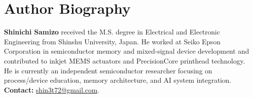 \documentclass[conference]{IEEEtran}
\begin{document}
\section*{Author Biography}
\textbf{Shinichi Samizo} received the M.S. degree in Electrical and Electronic Engineering from Shinshu University, Japan. He worked at Seiko Epson Corporation in semiconductor memory and mixed-signal device development and contributed to inkjet MEMS actuators and PrecisionCore printhead technology. He is currently an independent semiconductor researcher focusing on process/device education, memory architecture, and AI system integration. \textbf{Contact:} \href{mailto:shin3t72@gmail.com}{shin3t72@gmail.com}.
\end{document}
